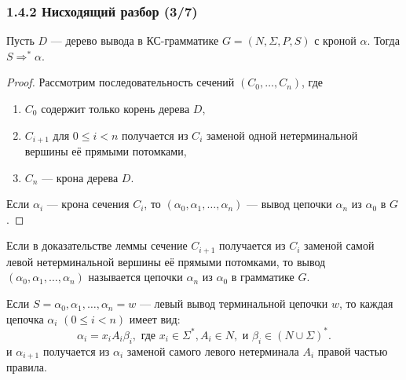 \begin{frame}
\frametitle{1.4.2 Нисходящий разбор (3/7)}
\begin{lemma}
    Пусть $D$ --- дерево вывода в КС-грамматике $G = (N, \Sigma, P, S)$ с кроной $\alpha$. Тогда $S \Rightarrow^* \alpha$.
\end{lemma}
\begin{proof}
    Рассмотрим последовательность сечений $(C_0,\dots,C_n)$, где
    \begin{enumerate}
        \item $C_0$ содержит только корень дерева $D$,
        \item $C_{i+1}$ для $0 \leq i < n$ получается из $C_i$ заменой одной нетерминальной вершины её прямыми потомками,
        \item $C_n$ --- крона дерева $D$.
    \end{enumerate}
    
    Если $\alpha_i$ --- крона сечения $C_i$, то $(\alpha_0, \alpha_1, \dots, \alpha_n)$ --- вывод цепочки $\alpha_n$ из $\alpha_0$ в $G$.
\end{proof}

Если в доказательстве леммы сечение $C_{i+1}$ получается из $C_i$ заменой самой левой нетерминальной вершины её прямыми потомками, то вывод $(\alpha_0, \alpha_1, \dots, \alpha_n)$ называется  цепочки $\alpha_n$ из $\alpha_0$ в грамматике $G$. 

Если $S = \alpha_0, \alpha_1, \dots, \alpha_n = w$ --- левый вывод терминальной цепочки $w$, то каждая цепочка $\alpha_i$ $(0 \leq i < n)$ имеет вид:
\[
\alpha_i = x_i A_i \beta_i,\text{ где } x_i \in \Sigma^*, A_i \in N, \text{ и } \beta_i \in (N \cup \Sigma)^*.
\]    
и $\alpha_{i+1}$ получается из $\alpha_i$ заменой самого левого нетерминала $A_i$ правой частью правила.
\end{frame}


